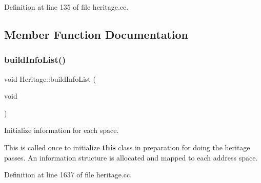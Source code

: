 Definition at line 135 of file heritage.\+cc.



\subsection{Member Function Documentation}
\mbox{\label{class_heritage_a7cca3fa6fe1e5d6241ca3e0f0a29af42}} 
\subsubsection{\texorpdfstring{buildInfoList()}{buildInfoList()}}
{\footnotesize\ttfamily void Heritage\+::build\+Info\+List (\begin{DoxyParamCaption}\item[{void}]{ }\end{DoxyParamCaption})}



Initialize information for each space. 

This is called once to initialize {\bfseries{this}} class in preparation for doing the heritage passes. An information structure is allocated and mapped to each address space. 

Definition at line 1637 of file heritage.\+cc.

